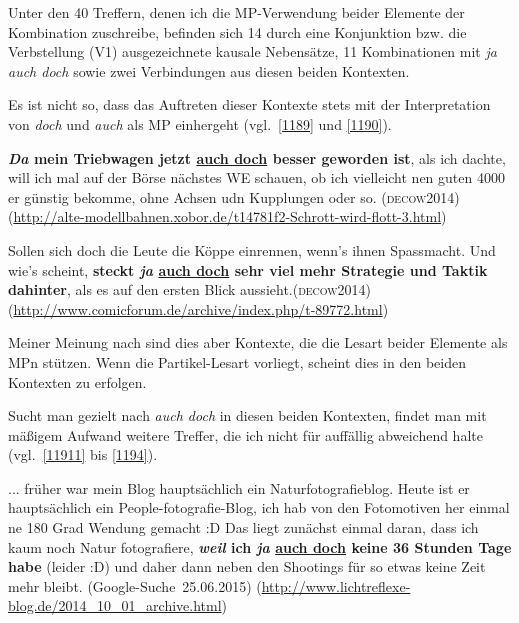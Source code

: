 Unter den 40 Treffern, denen ich die MP-Verwendung beider Elemente der Kombination zuschreibe, befinden sich 14 durch eine Konjunktion bzw. die Verb\-stellung (V1) ausgezeichnete kausale Nebensätze, 11 Kombinationen mit \textit{ja auch doch} sowie zwei Verbindungen aus diesen beiden Kontexten.

Es ist nicht so, dass das Auftreten dieser Kontexte stets mit der Interpretation von \textit{doch} und \textit{auch} als MP einhergeht (vgl.\ \ref{1189} und \ref{1190}).

\begin{exe}
	\ex\label{1189} 

	\textbf{\textit{Da} mein Triebwagen jetzt \ul{auch doch} besser geworden ist}, als ich dachte, will ich mal auf der Börse nächstes WE schauen, 		ob ich vielleicht nen guten 4000 er günstig bekomme, ohne Achsen udn Kupplungen oder so.			
	\newline\hbox{}\hfill\hbox{\scshape(decow2014)}	
	\newline
	{\scriptsize(\url{http://alte-modellbahnen.xobor.de/t14781f2-Schrott-wird-flott-3.html})}
\end{exe}	

\begin{exe}
	\ex\label{1190} 

	Sollen sich doch die Leute die Köppe einrennen, wenn's ihnen Spass\linebreak macht. Und wie's scheint, \textbf{steckt \textit{ja} \ul{auch doch} sehr viel 	mehr Strategie und Taktik dahinter}, als es auf den ersten Blick aussieht.\hfill\hbox{\scshape(decow2014)}	
	\newline
	{\scriptsize(\url{http://www.comicforum.de/archive/index.php/t-89772.html})}
\end{exe}					 
Meiner Meinung nach sind dies aber Kontexte, die die Lesart beider Elemente als MPn stützen. Wenn die Partikel-Lesart vorliegt, scheint dies in den beiden Kontexten zu erfolgen.

Sucht man gezielt nach \textit{auch doch} in diesen beiden Kontexten, findet man mit mäßigem Aufwand weitere Treffer, die ich nicht für auffällig abweichend halte (vgl.\ \ref{11911} bis \ref{1194}).
	
\begin{exe}
	\ex\label{11911} 

	... früher war mein Blog hauptsächlich ein Naturfotografieblog. Heute ist er hauptsächlich ein People-fotografie-Blog, ich hab von den Fotomotiven her 		einmal ne 180 Grad Wendung gemacht :D Das liegt zunächst einmal daran, dass ich kaum noch Natur fotografiere, \textbf{\textit{weil} ich \textit{ja} 		\ul{auch doch} keine 36 Stunden Tage habe} (leider :D) und daher dann neben den Shootings für so etwas keine Zeit mehr bleibt.				
	\newline\hbox{}\hfill\hbox{(Google-Suche 25.06.2015)}	
	\newline
	{\scriptsize(\url{http://www.lichtreflexe-blog.de/2014\_10\_01\_archive.html})}
\end{exe}	
	
